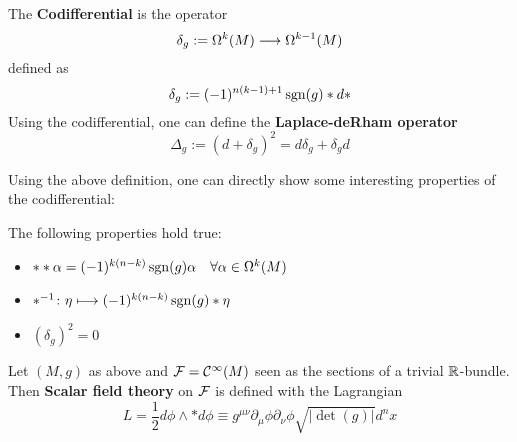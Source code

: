 \begin{definition}[Codifferential]
\label{def:codifferential}
  The \textbf{Codifferential} is the operator
  $$ \delta_g := \Omega^k(M) \longrightarrow \Omega^{k-1}(M) $$
  defined as
  $$ \delta_g := (-1)^{n(k-1)+1} \operatorname{sgn}(g) * d * $$
  Using the codifferential, one can define the \textbf{Laplace-deRham operator}
  $$ \Delta_g := (d+\delta_g)^2 = d \delta_g + \delta_g d $$
\end{definition}

Using the above definition, one can directly show some interesting properties of the codifferential:

\begin{lem}
  The following properties hold true:
  \begin{itemize}
    \item $**\alpha = (-1)^{k(n-k)} \operatorname{sgn}(g)\alpha \quad \forall \alpha \in \Omega^k(M)$
    \item $*^{-1}\colon \eta \longmapsto (-1)^{k(n-k)} \operatorname{sgn}(g) *\eta$
    \item $(\delta_g)^2 = 0$
  \end{itemize}
\end{lem}


\begin{definition}
  Let $(M,g)$ as above and ${\mathcal{F}}= \mathcal{C}^{\infty}(M)$ seen as the sections of a trivial $\mathbb{R}$-bundle. Then \textbf{Scalar field theory} on ${\mathcal{F}}$ is defined with the Lagrangian
  $$ L = \frac{1}{2} d \phi \wedge * d\phi \equiv  g^{\mu\nu} \partial_\mu \phi \partial_\nu \phi \sqrt{|\det(g)|} d^n x $$
\end{definition}

